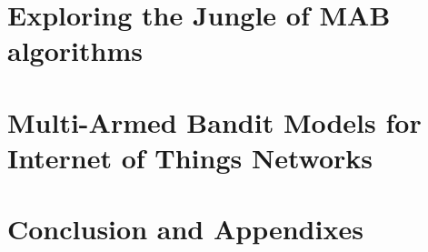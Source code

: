 \setcounter{mtc}{-1}
\adjustmtc

% 




\part{Exploring the Jungle of MAB algorithms}
\label{part:Introduction}








\part{Multi-Armed Bandit Models for Internet of Things Networks}
\label{part:MABIOT}








\part{Conclusion and Appendixes}
\label{part:Conclusion}




